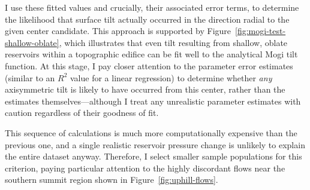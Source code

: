 I use these fitted values and crucially, their associated error terms, to determine the likelihood that surface tilt actually occurred in the direction radial to the given center candidate. This approach is supported by Figure~\ref{fig:mogi-test-shallow-oblate}, which illustrates that even tilt resulting from shallow, oblate reservoirs within a topographic edifice can be fit well to the analytical Mogi tilt function. At this stage, I pay closer attention to the parameter error estimates (similar to an $R^2$ value for a linear regression) to determine whether \emph{any} axisymmetric tilt is likely to have occurred from this center, rather than the estimates themselves---although I treat any unrealistic parameter estimates with caution regardless of their goodness of fit.

This sequence of calculations is much more computationally expensive than the previous one, and a single realistic reservoir pressure change is unlikely to explain the entire dataset anyway. Therefore, I select smaller sample populations for this criterion, paying particular attention to the highly discordant flows near the southern summit region shown in Figure~\ref{fig:uphill-flows}.




